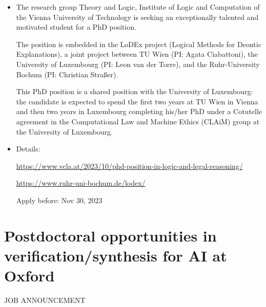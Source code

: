 \documentclass[prodmode,acmtecs]{acmsmall} %
\begin{document}
\begin{itemize}\item  The research group Theory and Logic, Institute of Logic and Computation of the Vienna University of Technology is seeking an exceptionally talented and motivated student for a PhD position. 
 
  The position is embedded in the LoDEx project (Logical Methods for Deontic Explanations), a joint project between TU Wien (PI: Agata Ciabattoni), the University of Luxembourg (PI: Leon van der Torre), and the Ruhr-University Bochum (PI: Christian Straßer). 
 
  This PhD position is a shared position with the University of Luxembourg: the candidate is expected to spend the first two years at TU Wien in Vienna and then two years in Luxembourg completing his/her PhD under a Cotutelle agreement in the Computational Law and Machine Ethics (CLAiM) group at the University of Luxembourg. 
 
\item  Details: 
 
  \href{https://www.vcla.at/2023/10/phd-position-in-logic-and-legal-reasoning/}{https://www.vcla.at/2023/10/phd-position-in-logic-and-legal-reasoning/} 
 
  \href{https://www.ruhr-uni-bochum.de/lodex/}{https://www.ruhr-uni-bochum.de/lodex/} 
 
Apply before: Nov 30, 2023 
 
\end{itemize}\section{Postdoctoral opportunities in verification/synthesis for AI at Oxford}\label{PostdoctoralopportunitiesinverificationsynthesisforAIatOxford}JOB ANNOUNCEMENT 
\end{document}
